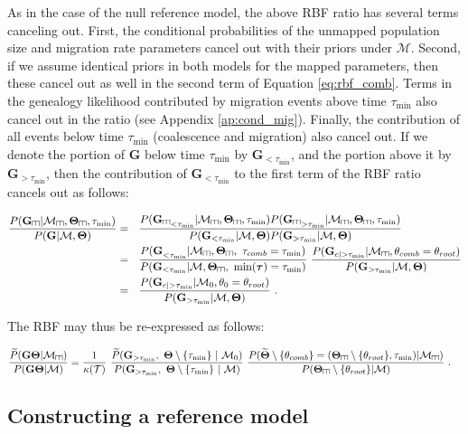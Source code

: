 \documentclass[11pt]{article}
\newcommand{\vect}[1]{\boldsymbol{\mathbf{#1}}}
\newcommand{\M}{\mathcal{M}}
\newcommand{\Tr}{\mathcal{T}}
\newcommand{\G}{\vect{G}}
\newcommand{\T}{\vect{\Theta}}
\newcommand{\GT}{\G\T}
\newcommand{\Pref}{\widetilde{P}}
\newcommand{\Tref}{\widetilde{\T}}
\newcommand{\1}{\mathbbm{1}}
\newcommand{\troot}{\theta_{root}}
\def\comb{\rotatebox[origin=c]{90}{$\exists$}}
\newcommand{\Mcomb}{\M_{\comb}}
\newcommand{\Gcomb}{\G_{\comb}}
\newcommand{\Tcomb}{\T_{\comb}}
\newcommand{\tmin}{\tau_{\text{min}}}
\newcommand{\taus}{\vect\tau}
\newcommand{\thcomb}{\theta_{comb}}
\newcommand{\tacomb}{\tau_{comb}}
\def\comb{\rotatebox[origin=c]{90}{$\exists$}}
\begin{document}
As in the case of the null reference model, the above RBF ratio has several terms canceling out. First, the conditional probabilities of the unmapped population size and
migration rate parameters cancel out with their priors under $\M$. Second, if we assume identical priors in both models for the mapped parameters,
then these cancel out as well in the second term of Equation \ref{eq:rbf_comb}.
Terms in the genealogy likelihood contributed by migration events above time $\tmin$ also cancel out in the ratio (see Appendix \ref{ap:cond_mig}).
Finally, the contribution of all events below time $\tmin$ (coalescence and migration) also cancel out.
If we denote the portion of $\G$ below time $\tmin$ by $\G_{<\tmin}$, and the portion above it by $\G_{>\tmin}$, then the contribution of $\G_{<\tmin}$ 
to the first term of the RBF ratio cancels out as follows:
%
%
\begin{small}
\begin{align}
\frac{ P(\Gcomb|\Mcomb,\Tcomb,\tmin) }{ P(\G|\M,\T)}
&=~~ \frac{ {P(\Gcomb}_{<\tmin}|\Mcomb,\Tcomb,\tmin) P({\Gcomb}_{>\tmin}|\Mcomb,\Tcomb,\tmin) }{ P(\G_{<\tmin}|\M,\T) P(\G_{>\tmin}|\M,\T)}   \notag \\
&=~~ \frac{ {P(\G}_{<\tmin}|\Mcomb,\Tcomb,~\tacomb=\tmin)}{ P(\G_{<\tmin}|\M,\Tcomb,~\min(\taus)=\tmin)} ~\frac{ P({\G}_{c|>\tmin}|\Mcomb,\thcomb=\troot) }{ P(\G_{>\tmin}|\M,\T)}   \notag \\
&=~~ \frac{ P({\G}_{c|>\tmin}|\M_0,\theta_0=\troot) }{ P(\G_{>\tmin}|\M,\T)} ~.  \label{eq:gen_ratio_comb}
\end{align}
\end{small}

The RBF may thus be re-expressed as follows:
%
%
\begin{small}
\begin{align}
\frac{\Pref(\GT|\Mcomb) }{P(\GT|\M)}
&= \frac{1}{\kappa(\Tr)} ~
   \frac{\Pref(\G_{>\tmin},\ \T\setminus\{\tmin\}\ |\ \M_0) }{P(\G_{>\tmin},\ \T\setminus\{\tmin\}\ |\ \M)} ~
   \frac{ P(\Tref\setminus\{\thcomb\}=(\Tcomb\setminus\{\troot\},\tmin)|\Mcomb) }{ P(\Tcomb\setminus\{\troot\}|\M) }~. \label{eq:rbf_comb1}
\end{align}
\end{small}



\subsection{Constructing a reference model}  \label{Constructing a Reference Model}
\end{document}
